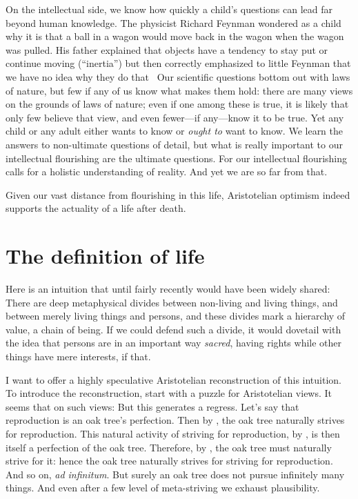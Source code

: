 On the intellectual side, we know how quickly a child's questions can lead far beyond human knowledge. The physicist 
Richard Feynman wondered as a child why it is that a ball in a wagon would move back in the wagon when the wagon was 
pulled. His father explained that objects have a tendency to stay put or continue moving (``inertia'') but then correctly
emphasized to little Feynman that we have no idea why they do that~\parencite[16]{FeynmanWhat} Our scientific questions bottom out with laws of nature,
but few if any of us know what makes them hold: there are many views on the grounds of laws of nature; even if one among these is 
true, it is likely that only few believe that view, and even fewer---if any---know it to be true. Yet any child or any adult 
either wants to know or \textit{ought to} want to know. We learn the answers to non-ultimate questions of detail, but what is 
really important to our intellectual flourishing are the ultimate questions. For our intellectual flourishing calls for a holistic
understanding of reality. And yet we are so far from that.

Given our vast distance from flourishing in this life, Aristotelian optimism indeed supports the actuality of a life
after death.

\section{The definition of life}\label{sec:life}
Here is an intuition that until fairly recently would have been widely shared: There are deep metaphysical divides between non-living and living things,
and between merely living things and persons, and these divides mark a hierarchy of value, a chain of being. If we could defend such a divide, it would
dovetail with the idea that persons are in an important way \textit{sacred}, having rights while other things have mere interests, if that.

I want to offer a highly speculative Aristotelian reconstruction of this intuition. To introduce the reconstruction, start with a puzzle for
Aristotelian views. It seems that on such views:
But this generates a regress. Let's say that reproduction is an oak tree's perfection. Then by , the oak tree naturally strives for
reproduction. This natural activity of striving for reproduction, by , is then itself a perfection of the oak tree. Therefore,
by , the oak tree must naturally strive for it: hence the oak tree naturally strives for striving for reproduction. And so on,
\textit{ad infinitum}. But surely an oak tree does not pursue infinitely many things. And even after a few level of meta-striving we exhaust plausibility.

